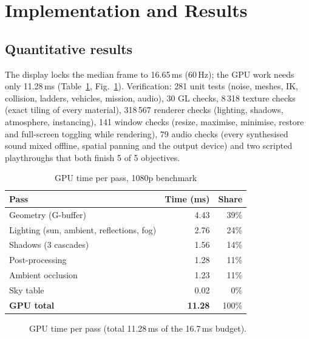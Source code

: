\documentclass[12pt,a4paper,oneside]{report}
\begin{document}
\section{Implementation and Results}
\subsection{Quantitative results}
The display locks the median frame to 16.65\,ms (60\,Hz); the GPU work needs only 11.28\,ms (Table~\ref{tab:gpu}, Fig.~\ref{fig:gpu}). Verification: 281 unit tests (noise, meshes, IK, collision, ladders, vehicles, mission, audio), 30 GL checks, 8\,318 texture checks (exact tiling of every material), 318\,567 renderer checks (lighting, shadows, atmosphere, instancing), 141 window checks (resize, maximise, minimise, restore and full-screen toggling while rendering), 79 audio checks (every synthesised sound mixed offline, spatial panning and the output device) and two scripted playthroughs that both finish 5 of 5 objectives.


\begin{table}[H]
	\caption{GPU time per pass, 1080p benchmark}\label{tab:gpu}
	\small{}
	\begin{tabularx}{\linewidth}{Xrr}
		\toprule \textbf{Pass} & \textbf{Time (ms)} & \textbf{Share}\\ \midrule
		Geometry (G-buffer) & 4.43 & 39\%\\ Lighting (sun, ambient, reflections, fog) & 2.76 & 24\%\\ Shadows (3 cascades) & 1.56 & 14\%\\ Post-processing & 1.28 & 11\%\\ Ambient occlusion & 1.23 & 11\%\\ Sky table & 0.02 & 0\%\\ \midrule
		\textbf{GPU total} & \textbf{11.28} & 100\%\\ \bottomrule
	\end{tabularx}
\end{table}

\begin{figure}[H]
	\centering
	\caption{GPU time per pass (total 11.28\,ms of the 16.7\,ms budget).}\label{fig:gpu}
\end{figure}
\end{document}

